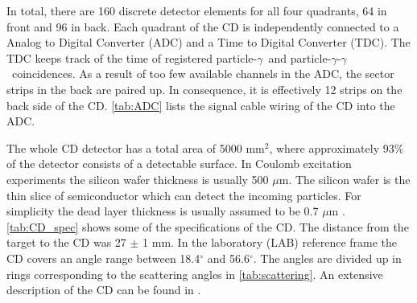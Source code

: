 \documentclass[twoside,english]{uiofysmaster/uiofysmaster}
\newcommand{\ga}{$\gamma$}
\let\orgautoref\autoref
\renewcommand{\autoref}
        {%
		 \def\sectionautorefname{Section}%
		 \def\subsectionautorefname{Section}%
		 \def\subsubsectionautorefname{Section}%
		 \def\chapterautorefname{Chapter}%
          \orgautoref}
\begin{document}
In total, there are 160 discrete detector elements for all four quadrants, 64 in front and 96 in back. 
Each quadrant of the CD is independently connected to a Analog to Digital Converter (ADC) and a Time to Digital Converter (TDC). 
The TDC keeps track of the time of registered particle-\ga\ and particle-\ga-\ga\ coincidences. 
As a result of too few available channels in the ADC, the sector strips in the back are paired up.
In consequence, it is effectively 12 strips on the back side of the CD. 
\autoref{tab:ADC} lists the signal cable wiring of the CD into the ADC. 

The whole CD detector has a total area of 5000 mm$^2$, where approximately 93$\%$ of the detector consists of a detectable surface. 
In Coulomb excitation experiments the silicon wafer thickness is usually 500 $\mu$m.
The silicon wafer is the thin slice of semiconductor which can detect the incoming particles. 
For simplicity the dead layer thickness is usually assumed to be 0.7 $\mu$m \cite{NWarr-CD, MB-spect}. 
\autoref{tab:CD_spec} shows some of the specifications of the CD.  
The distance from the target to the CD was 27 $\pm$ 1 mm. 
In the laboratory (LAB) reference frame the CD covers an angle range between 18.4$^\circ$ and 56.6$^\circ$. 
The angles are divided up in rings corresponding to the scattering angles in \autoref{tab:scattering}.
An extensive description of the CD can be found in \cite{CD-DSSSD}.

\end{document}
